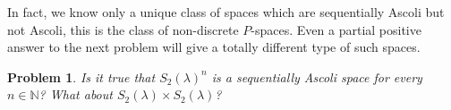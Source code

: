 \documentclass[preprint,11pt]{elsarticle}
\newtheorem{example}[theorem]{Example}
\newtheorem{problem}[theorem]{Problem}
\numberwithin{equation}{section}
\numberwithin{theorem}{section}
\newcommand{\w}{\omega}
\newcommand{\NN}{\mathbb{N}}
\begin{document}
In fact, we know only a unique class of spaces which are sequentially Ascoli but not Ascoli, this is the class of non-discrete $P$-spaces. Even a partial positive answer to the next problem will give a totally different type of such spaces.
\begin{problem}
Is it true that $S_2(\lambda)^n$ is a sequentially Ascoli space for every $n\in\NN$? What about $S_2(\lambda)\times S_2(\lambda)$?
\end{problem}






\end{document}
